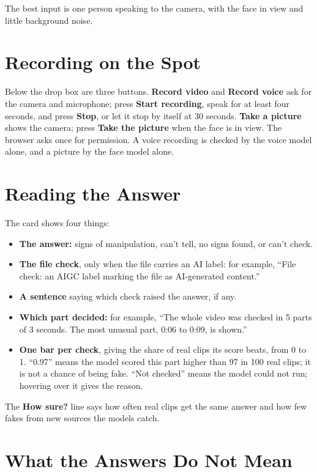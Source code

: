 The best input is one person speaking to the camera, with the face in view
and little background noise.

\section{Recording on the Spot}

Below the drop box are three buttons. \textbf{Record video} and
\textbf{Record voice} ask for the camera and microphone; press
\textbf{Start recording}, speak for at least four seconds, and press
\textbf{Stop}, or let it stop by itself at 30 seconds. \textbf{Take a picture}
shows the camera; press \textbf{Take the picture} when the face is in view.
The browser asks once for permission. A voice recording is checked by the
voice model alone, and a picture by the face model alone.

\section{Reading the Answer}

The card shows four things:

\begin{itemize}
    \item \textbf{The answer:} signs of manipulation, can't tell, no signs
    found, or can't check.
    \item \textbf{The file check}, only when the file carries an AI label:
    for example, ``File check: an AIGC label marking the file as
    AI-generated content.''
    \item \textbf{A sentence} saying which check raised the answer, if any.
    \item \textbf{Which part decided:} for example, ``The whole video was
    checked in 5 parts of 3 seconds. The most unusual part, 0:06 to 0:09, is
    shown.''
    \item \textbf{One bar per check}, giving the share of real clips its score
    beats, from 0 to 1. ``0.97'' means the model scored this part higher than 97
    in 100 real clips; it is not a chance of being fake. ``Not checked'' means the model could not run; hovering over it
    gives the reason.
\end{itemize}

The \textbf{How sure?} line says how often real clips get the same answer
and how few fakes from new sources the models catch.

\section{What the Answers Do Not Mean}

